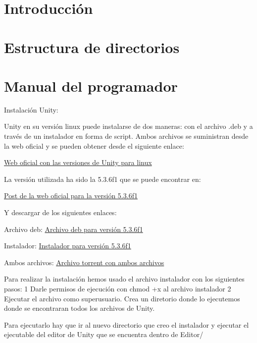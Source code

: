 
\section{Introducción}

\section{Estructura de directorios}

\section{Manual del programador}
Instalación Unity:

Unity \cite{unityweb} en su versión linux puede instalarse de dos maneras: con el archivo .deb y a través de un instalador en forma de script. Ambos archivos se suministran desde la web oficial y se pueden obtener desde el siguiente enlace:

\href{https://forum.unity3d.com/threads/unity-on-linux-release-notes-and-known-issues.350256/}{Web oficial con las versiones de Unity para linux}

La versión utilizada ha sido la 5.3.6f1 que se puede encontrar en:

\href{https://forum.unity3d.com/threads/unity-on-linux-release-notes-and-known-issues.350256/#post-2717623}{Post de la web oficial para la versión 5.3.6f1}

Y descargar de los siguientes enlaces:

Archivo deb: \href{http://download.unity3d.com/download_unity/linux/unity-editor-5.3.6f1+20160720_amd64.deb}{Archivo deb para versión 5.3.6f1}

Instalador: \href{http://download.unity3d.com/download_unity/linux/unity-editor-installer-5.3.6f1+20160720.sh}{Instalador para versión 5.3.6f1}

Ambos archivos: \href{http://files.unity3d.com/levi/unity-editor-5.3.6f1+20160720.torrent}{Archivo torrent con ambos archivos}

Para realizar la instalación hemos usado el archivo instalador con los siguientes pasos:
1 Darle permisos de ejecución con chmod +x al archivo instalador
2 Ejecutar el archivo como superusuario. Crea un diretorio donde lo ejecutemos donde se encontraran todos los archivos de Unity.

Para ejecutarlo hay que ir al nuevo directorio que creo el instalador y ejecutar el ejecutable del editor de Unity que se encuentra dentro de Editor/ 


